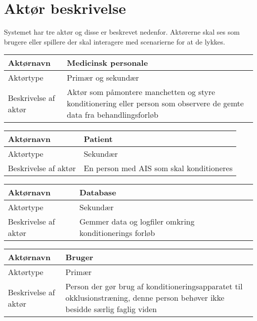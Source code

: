 	\section{Aktør beskrivelse}
	Systemet har tre aktør og disse er beskrevet nedenfor. Aktørerne skal ses som brugere eller spillere der skal interagere med scenarierne for at de lykkes. 
	
	\begin{center}
		\begin{tabular}{ | p{} | p{}| } 
			\hline
			Aktørnavn& Medicinsk personale  \\ 
			\hline
			Aktørtype & Primær og sekundær \\ 
			\hline
			Beskrivelse af aktør & Aktør som påmontere manchetten og styre konditionering eller person som observere de gemte data fra behandlingsforløb\\ 
			\hline
		\end{tabular}
	\end{center}
	
	\begin{center}
		\begin{tabular}{ | p{} | p{}| } 
			\hline
			Aktørnavn& Patient \\ 
			\hline
			Aktørtype & Sekundær \\ 
			\hline
			Beskrivelse af aktør & En person med AIS som skal konditioneres\\ 
			\hline
		\end{tabular}
	\end{center}
	
	\begin{center}
		\begin{tabular}{ | p{} | p{}| } 
			\hline
			Aktørnavn& Database \\ 
			\hline
			Aktørtype & Sekundær \\ 
			\hline
			Beskrivelse af aktør & Gemmer data og logfiler omkring konditionerings forløb\\ 
			\hline
		\end{tabular}
	\end{center}
	
	\begin{center}
		\begin{tabular}{ | p{} | p{}| } 
			\hline
			Aktørnavn& Bruger \\ 
			\hline
			Aktørtype & Primær \\ 
			\hline
			Beskrivelse af aktør & Person der gør brug af konditioneringsapparatet til okklusionstræning, denne person behøver ikke besidde særlig faglig viden \\ 
			\hline
		\end{tabular}
	\end{center}